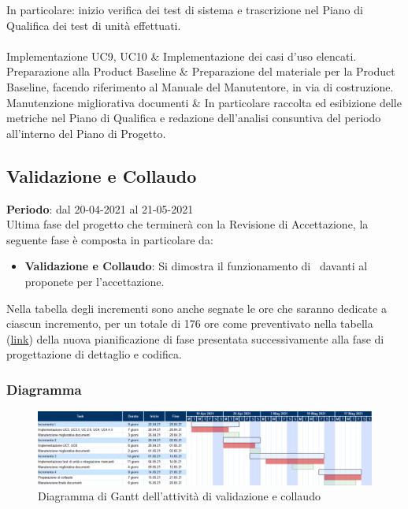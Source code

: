 \begin{longtabu}
						In particolare: inizio verifica dei test di sistema e trascrizione nel Piano di Qualifica dei test di unità effettuati. \\
					\hline
					 \\
					\hline
						Implementazione UC9, UC10 & 
						Implementazione dei casi d'uso elencati.\\
					\hline
						Preparazione alla Product Baseline & 
						Preparazione del materiale per la Product Baseline, facendo riferimento al Manuale del Manutentore, in via di costruzione.\\
					\hline
						Manutenzione migliorativa documenti & 
						In particolare raccolta ed esibizione delle metriche nel Piano di Qualifica e redazione dell'analisi consuntiva del periodo all'interno del Piano di Progetto. \\
					\hline
    		\end{longtabu}

	\subsection{Validazione e Collaudo}
	\textbf{Periodo}: dal 20-04-2021 al 21-05-2021 \\
	Ultima fase del progetto che terminerà con la Revisione di Accettazione, la seguente fase è composta in particolare da:
	\begin{itemize}
		\item \textbf{Validazione e Collaudo}: Si dimostra il funzionamento di \hd\ davanti al proponete per l'accettazione.
	\end{itemize}
	\noindent Nella tabella degli incrementi sono anche segnate le ore che saranno dedicate a ciascun incremento, per un totale di 176 ore come preventivato nella tabella (\hyperref[table:nuovo_orario_codifica]{link}) della nuova pianificazione di fase presentata successivamente alla fase di progettazione di dettaglio e codifica.
	
	\subsubsection{Diagramma}
		\begin{figure}[H]
        		\centering
        		\includegraphics[width=\textwidth]{source/img/Validazione_collaudo.png}
        		\caption{Diagramma di Gantt dell'attività di validazione e collaudo}
    		\end{figure}
